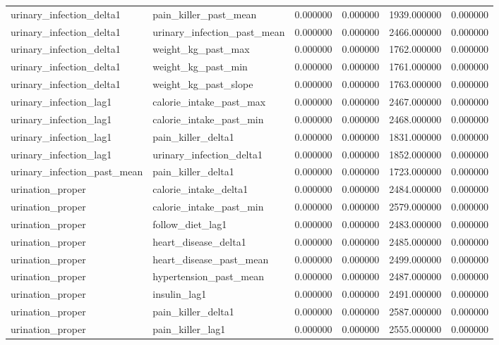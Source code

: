 \begin{longtable}{llrrrr}
urinary\_infection\_delta1 & pain\_killer\_past\_mean & 0.000000 & 0.000000 & 1939.000000 & 0.000000 \\
urinary\_infection\_delta1 & urinary\_infection\_past\_mean & 0.000000 & 0.000000 & 2466.000000 & 0.000000 \\
urinary\_infection\_delta1 & weight\_kg\_past\_max & 0.000000 & 0.000000 & 1762.000000 & 0.000000 \\
urinary\_infection\_delta1 & weight\_kg\_past\_min & 0.000000 & 0.000000 & 1761.000000 & 0.000000 \\
urinary\_infection\_delta1 & weight\_kg\_past\_slope & 0.000000 & 0.000000 & 1763.000000 & 0.000000 \\
urinary\_infection\_lag1 & calorie\_intake\_past\_max & 0.000000 & 0.000000 & 2467.000000 & 0.000000 \\
urinary\_infection\_lag1 & calorie\_intake\_past\_min & 0.000000 & 0.000000 & 2468.000000 & 0.000000 \\
urinary\_infection\_lag1 & pain\_killer\_delta1 & 0.000000 & 0.000000 & 1831.000000 & 0.000000 \\
urinary\_infection\_lag1 & urinary\_infection\_delta1 & 0.000000 & 0.000000 & 1852.000000 & 0.000000 \\
urinary\_infection\_past\_mean & pain\_killer\_delta1 & 0.000000 & 0.000000 & 1723.000000 & 0.000000 \\
urination\_proper & calorie\_intake\_delta1 & 0.000000 & 0.000000 & 2484.000000 & 0.000000 \\
urination\_proper & calorie\_intake\_past\_min & 0.000000 & 0.000000 & 2579.000000 & 0.000000 \\
urination\_proper & follow\_diet\_lag1 & 0.000000 & 0.000000 & 2483.000000 & 0.000000 \\
urination\_proper & heart\_disease\_delta1 & 0.000000 & 0.000000 & 2485.000000 & 0.000000 \\
urination\_proper & heart\_disease\_past\_mean & 0.000000 & 0.000000 & 2499.000000 & 0.000000 \\
urination\_proper & hypertension\_past\_mean & 0.000000 & 0.000000 & 2487.000000 & 0.000000 \\
urination\_proper & insulin\_lag1 & 0.000000 & 0.000000 & 2491.000000 & 0.000000 \\
urination\_proper & pain\_killer\_delta1 & 0.000000 & 0.000000 & 2587.000000 & 0.000000 \\
urination\_proper & pain\_killer\_lag1 & 0.000000 & 0.000000 & 2555.000000 & 0.000000 \\

\end{longtable}
